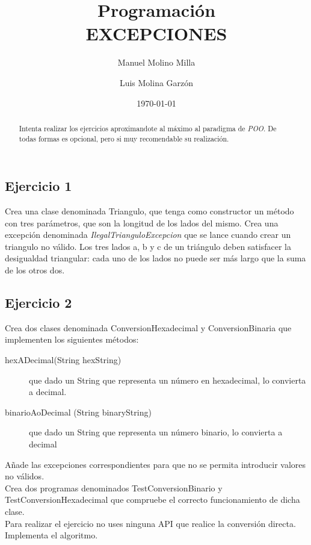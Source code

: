\documentclass[4paper]{article}
\author{Manuel Molino Milla \and Luis Molina Garzón}
\title{\textbf{Programación}
\\EXCEPCIONES}
\date{\today}
\begin{document}
\maketitle

\begin{abstract}
Intenta realizar los ejercicios aproximandote al máximo al paradigma de \emph{POO}. De todas formas es opcional, pero si muy recomendable su realización.
\end{abstract}


\subsection*{Ejercicio 1}
Crea una clase denominada Triangulo, que tenga como constructor un método con tres parámetros, que son la longitud de los lados del mismo. Crea una excepción denominada \emph{IlegalTrianguloExcepcion} que se lance cuando crear un triangulo no válido.
Los tres lados a, b y c de un triángulo deben satisfacer la desigualdad triangular: cada uno de los lados no puede ser más largo que la suma de los otros dos.
\subsection*{Ejercicio 2}
Crea dos clases denominada ConversionHexadecimal y ConversionBinaria que implementen los siguientes métodos:
\begin{description}
\item[hexADecimal(String hexString)] que dado un String que representa un número en hexadecimal, lo convierta a decimal.
\item[binarioAoDecimal (String binaryString)] que dado un String que representa un número binario, lo convierta a decimal
\end{description}
Añade las excepciones correspondientes para que no se permita introducir valores no válidos.\\
Crea dos programas denominados TestConversionBinario y TestConversionHexadecimal que compruebe el correcto funcionamiento de dicha clase.
\\
Para realizar el ejercicio no uses ninguna API que realice la conversión directa. Implementa el algoritmo.
\end{document}
